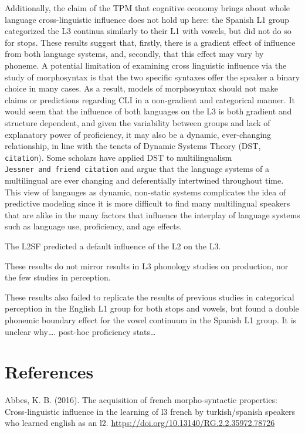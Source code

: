 \documentclass[
  english,
  man]{apa6}
\begin{document}
Additionally, the claim of the TPM that cognitive economy brings about whole language cross-linguistic influence does not hold up here: the Spanish L1 group categorized the L3 continua similarly to their L1 with vowels, but did not do so for stops. These results suggest that, firstly, there is a gradient effect of influence from both language systems, and, secondly, that this effect may vary by phoneme. A potential limitation of examining cross linguistic influence via the study of morphosyntax is that the two specific syntaxes offer the speaker a binary choice in many cases. As a result, models of morphosyntax should not make claims or predictions regarding CLI in a non-gradient and categorical manner. It would seem that the influence of both languages on the L3 is both gradient and structure dependent, and given the variability between groups and lack of explanatory power of proficiency, it may also be a dynamic, ever-changing relationship, in line with the tenets of Dynamic Systems Theory (DST, \texttt{citation}). Some scholars have applied DST to multilingualism \texttt{Jessner\ and\ friend\ citation} and argue that the language systems of a multilingual are ever changing and deferentially intertwined throughout time. This view of langauges as dynamic, non-static systems complicates the idea of predictive modeling since it is more difficult to find many multilingual speakers that are alike in the many factors that influence the interplay of language systems such as language use, proficiency, and age effects.

The L2SF predicted a default influence of the L2 on the L3.

These results do not mirror results in L3 phonology studies on production, nor the few studies in perception.

These results also failed to replicate the results of previous studies in categorical perception in the English L1 group for both stops and vowels, but found a double phonemic boundary effect for the vowel continuum in the Spanish L1 group. It is unclear why\ldots. post-hoc proficiency stats\ldots{}

\hypertarget{references}{%
\section{References}\label{references}}

\begingroup
\setlength{\parindent}{-0.5in}
\setlength{\leftskip}{0.5in}

\hypertarget{refs}{}
\leavevmode\hypertarget{ref-abbes_acquisition_2016}{}%
Abbes, K. B. (2016). The acquisition of french morpho-syntactic properties: Cross-linguistic influence in the learning of l3 french by turkish/spanish speakers who learned english as an l2. \url{https://doi.org/10.13140/RG.2.2.35972.78726}
\end{document}
